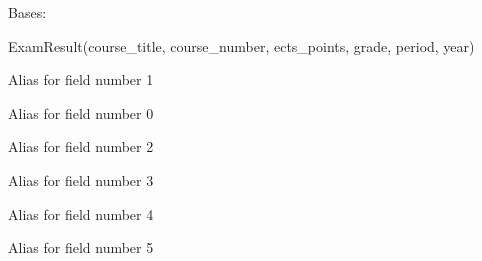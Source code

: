\documentclass[letterpaper,10pt,english]{sphinxmanual}
\begin{document}
\begin{fulllineitems}
\label{cv_kickstarter:cv_kickstarter.cnapi.ExamResult}
Bases: 

ExamResult(course\_title, course\_number, ects\_points, grade, period, year)

\begin{fulllineitems}
\label{cv_kickstarter:cv_kickstarter.cnapi.ExamResult.course_number}
Alias for field number 1

\end{fulllineitems}


\begin{fulllineitems}
\label{cv_kickstarter:cv_kickstarter.cnapi.ExamResult.course_title}
Alias for field number 0

\end{fulllineitems}


\begin{fulllineitems}
\label{cv_kickstarter:cv_kickstarter.cnapi.ExamResult.ects_points}
Alias for field number 2

\end{fulllineitems}


\begin{fulllineitems}
\label{cv_kickstarter:cv_kickstarter.cnapi.ExamResult.grade}
Alias for field number 3

\end{fulllineitems}


\begin{fulllineitems}
\label{cv_kickstarter:cv_kickstarter.cnapi.ExamResult.period}
Alias for field number 4

\end{fulllineitems}


\begin{fulllineitems}
\label{cv_kickstarter:cv_kickstarter.cnapi.ExamResult.year}
Alias for field number 5

\end{fulllineitems}


\end{fulllineitems}
\end{document}
